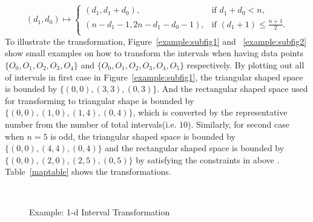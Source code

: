 \documentclass[AMA,LATO1COL]{WileyNJD-v2}
\begin{document}
\begin{equation*}
(d_1, d_0) \mapsto
\begin{cases}
(d_1, d_1 + d_0), & \mbox{if $d_1 + d_0 < n$,} \\
(n - d_1 - 1, 2 n - d_1 - d_0 -1), & \mbox{if $(d_1+1)\leq \frac{n+1}{2}$.}\\
\end{cases}
\end{equation*}
 To illustrate the transformation, Figure~\ref{example:subfig1} and ~\ref{example:subfig2} show small examples on how to transform the intervals when having data points $\{O_0,O_1,O_2,O_3,O_4\}$ and $\{O_0,O_1,O_2,O_3,O_4,O_5\}$ respectively. By plotting out all of intervals in first case in Figure~\ref{example:subfig1}, the triangular shaped space is bounded by $\{(0,0), (3,3), (0,3)\}$. And the rectangular shaped space used for transforming to triangular shape is bounded by $\{(0,0),(1,0), (1,4),(0,4)\}$, which is converted by the representative number from  the number of total intervals(i.e. $10$). Similarly, for second case when $n=5$ is odd,  the triangular shaped space is bounded by $\{(0,0),(4,4),(0,4)\}$ and the rectangular shaped space is bounded by $\{(0,0),(2,0),(2,5),(0,5)\}$ by satisfying the constraints in above . Table~\ref{maptable} shows the transformations.

\begin{figure}[h]
\centering
{}
~~
\caption{Example: 1-d Interval Transformation}\label{example}
\end{figure}
\end{document}
